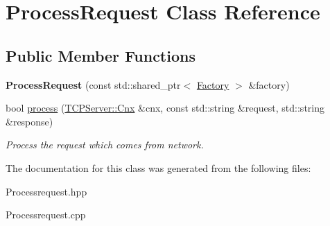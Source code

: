 \hypertarget{class_process_request}{\section{Process\-Request Class Reference}
\label{class_process_request}
}
\subsection*{Public Member Functions}
\begin{DoxyCompactItemize}
\item 
\hypertarget{class_process_request_a4b873e251b1d64c66e13864c64523305}{{\bfseries Process\-Request} (const std\-::shared\-\_\-ptr$<$ \hyperlink{class_factory}{Factory} $>$ \&factory)}\label{class_process_request_a4b873e251b1d64c66e13864c64523305}

\item 
\hypertarget{class_process_request_ae47375579973072ebddfc554b991d80b}{bool \hyperlink{class_process_request_ae47375579973072ebddfc554b991d80b}{process} (\hyperlink{class_t_c_p_server_1_1_cnx}{T\-C\-P\-Server\-::\-Cnx} \&cnx, const std\-::string \&request, std\-::string \&response)}\label{class_process_request_ae47375579973072ebddfc554b991d80b}

\begin{DoxyCompactList}\small\item\em Process the request which comes from network. \end{DoxyCompactList}\end{DoxyCompactItemize}


The documentation for this class was generated from the following files\-:\begin{DoxyCompactItemize}
\item 
Processrequest.\-hpp\item 
Processrequest.\-cpp\end{DoxyCompactItemize}
